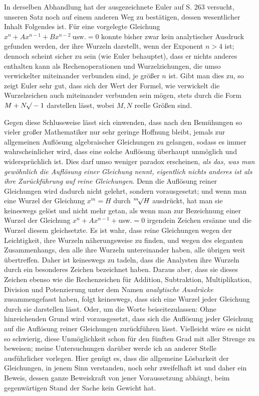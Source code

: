 In derselben Abhandlung hat der ausgezeichnete Euler auf S. 263 versucht, unseren Satz noch auf einem anderen Weg zu bestätigen, dessen wesentlicher Inhalt Folgendes ist. Für eine vorgelegte Gleichung $x^n+Ax^{n-1}+Bx^{n-2}\ \text{usw.}=0$ konnte bisher zwar kein analytischer Ausdruck gefunden werden, der ihre Wurzeln darstellt, wenn der Exponent $n>4$ ist; dennoch scheint sicher zu sein (wie Euler behauptet), dass er nichts anderes enthalten kann als Rechenoperationen und Wurzelziehungen, die umso verwickelter miteinander verbunden sind, je größer $n$ ist. Gibt man dies zu, so zeigt Euler sehr gut, dass sich der Wert der Formel, wie verwickelt die Wurzelzeichen auch miteinander verbunden sein mögen, stets durch die Form $M+N\BareRoot{-1}$ darstellen lässt, wobei $M,N$ reelle Größen sind.

Gegen diese Schlussweise lässt sich einwenden, dass nach den Bemühungen so vieler großer Mathematiker nur sehr geringe Hoffnung bleibt, jemals zur allgemeinen Auflösung algebraischer Gleichungen zu gelangen, sodass es immer wahrscheinlicher wird, dass eine solche Auflösung überhaupt unmöglich und widersprüchlich ist. Dies darf umso weniger paradox erscheinen, \textit{als das, was man gewöhnlich die Auflösung einer Gleichung nennt, eigentlich nichts anderes ist als ihre Zurückführung auf reine Gleichungen}. Denn die Auflösung reiner Gleichungen wird dadurch nicht gelehrt, sondern vorausgesetzt; und wenn man eine Wurzel der Gleichung $x^m=H$ durch $\BareRoot[m]{H}$ ausdrückt, hat man sie keineswegs gelöst und nicht mehr getan, als wenn man zur Bezeichnung einer Wurzel der Gleichung $x^n+Ax^{n-1}+\text{usw.}=0$ irgendein Zeichen ersänne und die Wurzel diesem gleichsetzte. Es ist wahr, dass reine Gleichungen wegen der Leichtigkeit, ihre Wurzeln näherungsweise zu finden, und wegen des eleganten Zusammenhangs, den alle ihre Wurzeln untereinander haben, alle übrigen weit übertreffen. Daher ist keineswegs zu tadeln, dass die Analysten ihre Wurzeln durch ein besonderes Zeichen bezeichnet haben. Daraus aber, dass sie dieses Zeichen ebenso wie die Rechenzeichen für Addition, Subtraktion, Multiplikation, Division und Potenzierung unter dem Namen \textit{analytische Ausdrücke} zusammengefasst haben, folgt keineswegs, dass sich eine Wurzel jeder Gleichung durch sie darstellen lässt. Oder, um die Worte beiseitezulassen: Ohne hinreichenden Grund wird vorausgesetzt, dass sich die Auflösung jeder Gleichung auf die Auflösung reiner Gleichungen zurückführen lässt. Vielleicht wäre es nicht so schwierig, diese Unmöglichkeit schon für den fünften Grad mit aller Strenge zu beweisen; meine Untersuchungen darüber werde ich an anderer Stelle ausführlicher vorlegen.
Hier genügt es, dass die allgemeine Lösbarkeit der Gleichungen, in jenem Sinn verstanden, noch sehr zweifelhaft ist und daher ein Beweis, dessen ganze Beweiskraft von jener Voraussetzung abhängt, beim gegenwärtigen Stand der Sache kein Gewicht hat.
